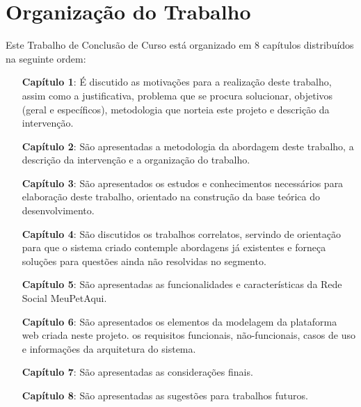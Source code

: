 \section{Organização do Trabalho}
\label{sec:OrganizacaoTrabalho}
Este Trabalho de Conclusão de Curso está organizado em 8 capítulos distribuídos na seguinte ordem: 
\begin{enumerate}
\item[\textbf{Capítulo 1}:] É discutido as motivações para a realização deste trabalho, assim como a justificativa, problema que se procura solucionar, objetivos (geral e específicos), metodologia que norteia este projeto e descrição da intervenção.


\item[\textbf{Capítulo 2}:] São apresentadas a metodologia da abordagem deste trabalho, a descrição da intervenção e a organização do trabalho.

\item[\textbf{Capítulo 3}:] São apresentados os estudos e conhecimentos necessários para elaboração deste trabalho, orientado na construção da base teórica do desenvolvimento.

\item[\textbf{Capítulo 4}:] São discutidos os trabalhos correlatos, servindo de orientação para que o sistema criado contemple abordagens já existentes e forneça soluções para questões ainda não resolvidas no segmento.

\item[\textbf{Capítulo 5}:] São apresentadas as funcionalidades e características da Rede Social MeuPetAqui.

\item[\textbf{Capítulo 6}:] São apresentados os elementos da modelagem da plataforma web criada neste projeto. os requisitos funcionais, não-funcionais, casos de uso e informações da arquitetura do sistema.
\item[\textbf{Capítulo 7}:] São apresentadas as considerações finais.
\item[\textbf{Capítulo 8}:] São apresentadas as sugestões para trabalhos futuros.
\end{enumerate}
